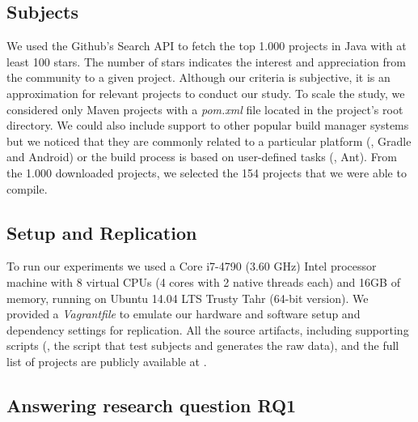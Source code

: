 \subsection{Subjects}
\label{sec:subjects}

We used the Github's Search API to fetch the top 1.000 projects in
Java with at least 100 stars. The number of stars indicates the
interest and appreciation from the community to a given project.
 Although our
criteria is subjective, it is an approximation for relevant projects
to conduct our study. To
scale the study, we considered only Maven projects with a
\emph{pom.xml} file located in the project's root directory. We could
also include support to other popular build manager systems but we
noticed that they are commonly related to a particular platform (\eg,
Gradle and Android) or the build process is based on user-defined
tasks (\eg, Ant).   From the 1.000 downloaded projects, we selected the
154 projects that we were able to compile. 

\subsection{Setup and Replication}
\label{sec:setup}

To run our experiments we used a Core i7-4790 (3.60 GHz) Intel
processor machine with 8 virtual CPUs (4 cores with 2 native threads
each) and 16GB of memory, running on Ubuntu 14.04 LTS Trusty Tahr
(64-bit version). We provided a \emph{Vagrantfile} to emulate our
hardware and software setup and dependency settings for replication.
All the source artifacts, including supporting scripts (\eg, the
script that test subjects and generates the raw data), and the full
list of projects are publicly available at .

\subsection{Answering research question RQ1}
\label{sec:rqone}

